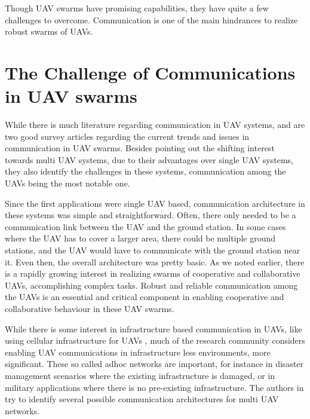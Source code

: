 Though UAV swarms have promising capabilities, they have quite a few challenges to overcome. Communication is one of the main hindrances to realize robust swarms of UAVs.

\section{The Challenge of Communications in UAV swarms}
While there is much literature regarding communication in UAV systems, \cite{fanets} and \cite{lavgupta} are two good survey articles regarding the current trends and issues in communication in UAV swarms. Besides pointing out the shifting interest towards multi UAV systems, due to their advantages over single UAV systems, they also identify the challenges in these systems, communication among the UAVs being the most notable one. 

Since the first applications were single UAV based, communication architecture in these systems was simple and straightforward. Often, there only needed to be a communication link between the UAV and the ground station. In some cases where the UAV has to cover a larger area, there could be multiple ground stations, and the UAV would have to communicate with the ground station near it. Even then, the overall architecture was pretty basic. As we noted earlier, there is a rapidly growing interest in realizing swarms of cooperative and collaborative UAVs, accomplishing complex tasks. Robust and reliable communication among the UAVs is an essential and critical component in enabling cooperative and collaborative behaviour in these UAV swarms.

While there is some interest in infrastructure based communication in UAVs, like using cellular infrastructure for UAVs \cite{celsur}, much of the research community considers enabling UAV communications in infrastructure less environments, more significant. These so called adhoc networks are important, for instance in disaster management scenarios where the existing infrastructure is damaged, or in military applications where there is no pre-existing infrastructure. The authors in \cite{lavgupta} try to identify several possible communication architectures for multi UAV networks.

